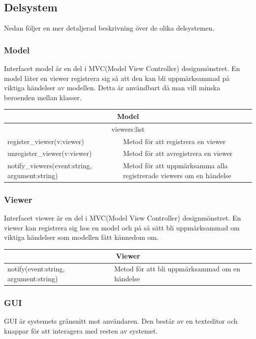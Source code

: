 \subsection{Delsystem}
Nedan följer en mer detaljerad beskrivning över de olika delsystemen.

\subsubsection{Model}
Interfacet model är en del i MVC(Model View Controller) designmönstret. En model låter en viewer registrera sig så att den kan bli uppmärksammad på viktiga händelser av modellen. Detta är användbart då man vill minska beroenden mellan klasser.


\begin{tabular}{|l|p{10 cm}|}
\hline
\multicolumn{2}{|c|}{\textbf{Model}} \\
\hline
\multicolumn{2}{|c|}{viewers:list} \\
\hline
register\_viewer(v:viewer) & Metod för att registrera en viewer\\
unregister\_viewer(v:viewer) & Metod för att avregistrera en viewer\\
notify\_viewers(event:string, argument:string) & Metod för att uppmärksamma alla registrerade
viewers om en händelse\\
\hline
\end{tabular}

\subsubsection{Viewer}
Interfacet viewer är en del i MVC(Model View Controller) designmönstret. En viewer kan registrera sig hos en model och på så sätt bli uppmärksammad om viktiga händelser som modellen fått kännedom om.


\begin{tabular}{|l|p{10 cm}|}
\hline
\multicolumn{2}{|c|}{\textbf{Viewer}} \\
\hline
\hline
notify(event:string, argument:string) & Metod för att bli uppmärksammad om en händelse\\
\hline
\end{tabular}

\subsubsection{GUI}
GUI är systemets gränsnitt mot användaren. Den består av en texteditor och knappar för att interagera med resten av systemet.


